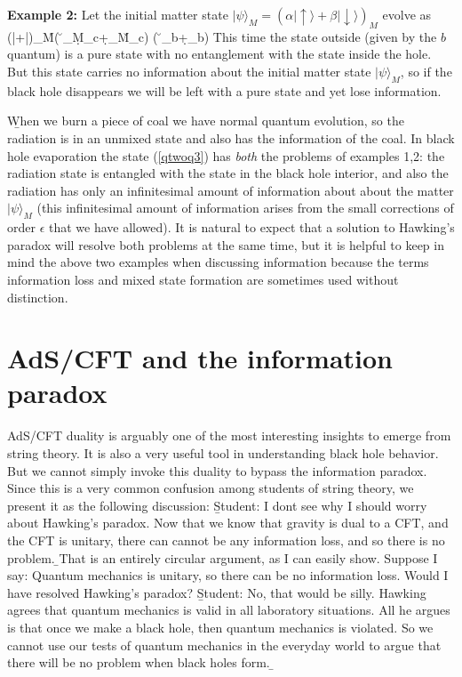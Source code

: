 \documentclass[12pt]{article}
\begin{document}
\b

{\bf Example 2:} \quad Let the initial matter state $|\psi\rangle_M=(\alpha|\uparrow\rangle+\beta |\downarrow\rangle)_M$ evolve as
\be
\Big(\alpha|\uparrow\rangle+\beta |\downarrow\rangle\Big)_M\r \Big ( \alpha \u_M\d_c+\beta \d_M\u_c\Big ) \otimes \Big( \sq \u_b+\sq \d_b\Big)
\ee
This time the state outside (given by the $b$ quantum) is a pure state with no entanglement with the state inside the hole. But this state carries no information about the initial matter state $|\psi\rangle _M$, so if the black hole disappears we will be left with a pure state and yet lose information.

\b

When we burn a piece of coal we have normal quantum evolution, so the radiation is in an unmixed state and also has the information of the coal. In black hole evaporation the state (\ref{qtwoq3}) has {\it both} the problems of examples 1,2: the radiation state is entangled with the state in the black hole interior, and also the radiation has only an infinitesimal amount of information about about the matter $|\psi\rangle_M$ (this infinitesimal amount of information arises from the small corrections of order $\epsilon$ that we have allowed). It is natural to expect that a solution to Hawking's paradox will resolve both problems at the same time, but it is helpful to keep in mind the above two examples when discussing information because the terms information loss and mixed state formation are sometimes used without distinction.

\section{AdS/CFT and the information paradox}

AdS/CFT \cite{maldacena, gkp, witten} duality is arguably one of the most interesting insights to emerge from string theory. It is also a very useful tool in understanding black hole behavior. But we cannot simply invoke this duality to bypass the information paradox. Since this is a very common confusion among students of string theory, we present it as the following discussion:
\b

Student: I dont see why I should worry about Hawking's paradox. Now that we know that gravity is dual to a CFT, and the CFT is unitary, there can cannot be any information loss, and so there is no problem.
\b


\hb That is an entirely circular argument, as I can easily show. Suppose I say: Quantum mechanics is unitary, so there can be no information loss. Would I have resolved Hawking's paradox?
\b
Student: No, that would be silly. Hawking agrees that quantum mechanics is valid in all laboratory situations. All he argues is that once we make a black hole, then quantum mechanics is violated. So we cannot use our tests of quantum mechanics in the everyday world to argue that there will be no problem when black holes form.
\b
\end{document}
